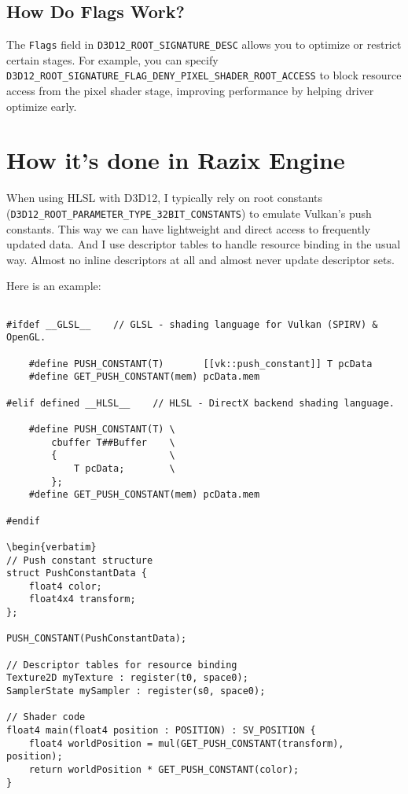 \documentclass{article}
\begin{document}
\subsection*{How Do Flags Work?}
The \texttt{Flags} field in \texttt{D3D12\_ROOT\_SIGNATURE\_DESC} allows you to optimize or restrict certain stages. For example, you can specify \texttt{D3D12\_ROOT\_SIGNATURE\_FLAG\_DENY\_PIXEL\_SHADER\_ROOT\_ACCESS} to block resource access from the pixel shader stage, improving performance by helping driver optimize early. 

\section*{How it's done in Razix Engine}
When using HLSL with D3D12, I typically rely on root constants (\texttt{D3D12\_ROOT\_PARAMETER\_TYPE\_32BIT\_CONSTANTS}) to emulate Vulkan's push constants. This  way we can have lightweight and direct access to frequently updated data. And I use descriptor tables to handle resource binding in the usual way. Almost no inline descriptors at all and almost never update descriptor sets.

Here is an example:
\begin{verbatim}

#ifdef __GLSL__    // GLSL - shading language for Vulkan (SPIRV) & OpenGL.

    #define PUSH_CONSTANT(T)       [[vk::push_constant]] T pcData
    #define GET_PUSH_CONSTANT(mem) pcData.mem

#elif defined __HLSL__    // HLSL - DirectX backend shading language.

    #define PUSH_CONSTANT(T) \
        cbuffer T##Buffer    \
        {                    \
            T pcData;        \
        };
    #define GET_PUSH_CONSTANT(mem) pcData.mem

#endif

\begin{verbatim}
// Push constant structure
struct PushConstantData {
    float4 color;
    float4x4 transform;
};

PUSH_CONSTANT(PushConstantData);

// Descriptor tables for resource binding
Texture2D myTexture : register(t0, space0);
SamplerState mySampler : register(s0, space0);

// Shader code
float4 main(float4 position : POSITION) : SV_POSITION {
    float4 worldPosition = mul(GET_PUSH_CONSTANT(transform), position);
    return worldPosition * GET_PUSH_CONSTANT(color);
}
\end{verbatim}
\end{document}
